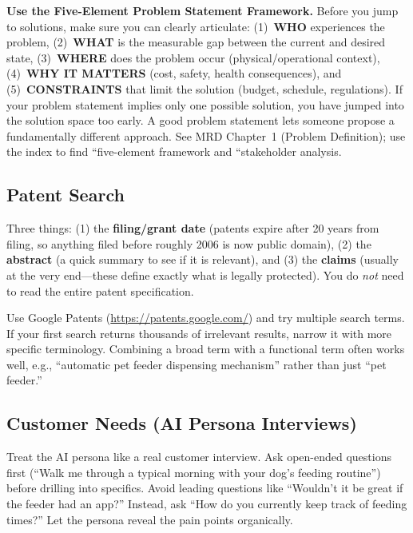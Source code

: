 \documentclass[11pt,letterpaper]{article}
\begin{document}
\begin{protip}
\textbf{Use the Five-Element Problem Statement Framework.} Before you jump to solutions, make sure you can clearly articulate: (1)~\textbf{WHO} experiences the problem, (2)~\textbf{WHAT} is the measurable gap between the current and desired state, (3)~\textbf{WHERE} does the problem occur (physical/operational context), (4)~\textbf{WHY IT MATTERS} (cost, safety, health consequences), and (5)~\textbf{CONSTRAINTS} that limit the solution (budget, schedule, regulations). If your problem statement implies only one possible solution, you have jumped into the solution space too early. A good problem statement lets someone propose a fundamentally different approach. See MRD Chapter~1 (Problem Definition); use the index to find ``five-element framework and ``stakeholder analysis.
\end{protip}

\subsection{Patent Search}

\begin{faqbox}
Three things: (1) the \textbf{filing/grant date} (patents expire after 20 years from filing, so anything filed before roughly 2006 is now public domain), (2) the \textbf{abstract} (a quick summary to see if it is relevant), and (3) the \textbf{claims} (usually at the very end---these define exactly what is legally protected). You do \textit{not} need to read the entire patent specification.
\end{faqbox}

\begin{tipbox}
Use Google Patents (\url{https://patents.google.com/}) and try multiple search terms. If your first search returns thousands of irrelevant results, narrow it with more specific terminology. Combining a broad term with a functional term often works well, e.g., ``automatic pet feeder dispensing mechanism'' rather than just ``pet feeder.''
\end{tipbox}

\subsection{Customer Needs (AI Persona Interviews)}

\begin{faqbox}
Treat the AI persona like a real customer interview. Ask open-ended questions first (``Walk me through a typical morning with your dog's feeding routine'') before drilling into specifics. Avoid leading questions like ``Wouldn't it be great if the feeder had an app?'' Instead, ask ``How do you currently keep track of feeding times?'' Let the persona reveal the pain points organically.
\end{faqbox}
\end{document}
